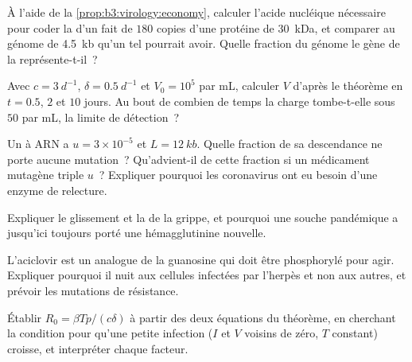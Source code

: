 \begin{exercise}[$\star\star$]\label{exo:b3:virology:5}
À l'aide de la \cref{prop:b3:virology:economy}, calculer l'acide
nucléique nécessaire pour coder la  d'un  fait de $180$
copies d'une protéine de \qty{30}{kDa}, et comparer au génome de
\qty{4.5}{kb} qu'un tel  pourrait avoir. Quelle fraction du génome
le gène de la  représente-t-il~?
\end{exercise}

\begin{exercise}[$\star\star$]\label{exo:b3:virology:6}
Avec $c = \qty{3}{d^{-1}}$, $\delta = \qty{0.5}{d^{-1}}$ et $V_{0} =
10^{5}$ par mL, calculer $V$ d'après le théorème en $t = 0.5$, $2$ et
$10$ jours. Au bout de combien de temps la charge tombe-t-elle sous
$50$ par mL, la limite de détection~?
\end{exercise}

\begin{exercise}[$\star\star$]\label{exo:b3:virology:7}
Un  à ARN a $u = 3\times 10^{-5}$ et $L = \qty{12}{kb}$. Quelle
fraction de sa descendance ne porte aucune mutation~? Qu'advient-il de
cette fraction si un médicament mutagène triple $u$~? Expliquer
pourquoi les coronavirus ont eu besoin d'une enzyme de relecture.
\end{exercise}

\begin{exercise}[$\star\star$]\label{exo:b3:virology:8}
Expliquer le glissement et la  de la grippe, et
pourquoi une souche pandémique a jusqu'ici toujours porté une
hémagglutinine nouvelle.
\end{exercise}

\begin{exercise}[$\star\star$]\label{exo:b3:virology:9}
L'aciclovir est un analogue de la guanosine qui doit être phosphorylé
pour agir. Expliquer pourquoi il nuit aux cellules infectées par
l'herpès et non aux autres, et prévoir les mutations de résistance.
\end{exercise}

\begin{exercise}[$\star\star\star$]\label{exo:b3:virology:10}
Établir $R_{0} = \beta Tp/(c\delta)$ à partir des deux équations du
théorème, en cherchant la condition pour qu'une petite infection ($I$
et $V$ voisins de zéro, $T$ constant) croisse, et interpréter chaque
facteur.
\end{exercise}

